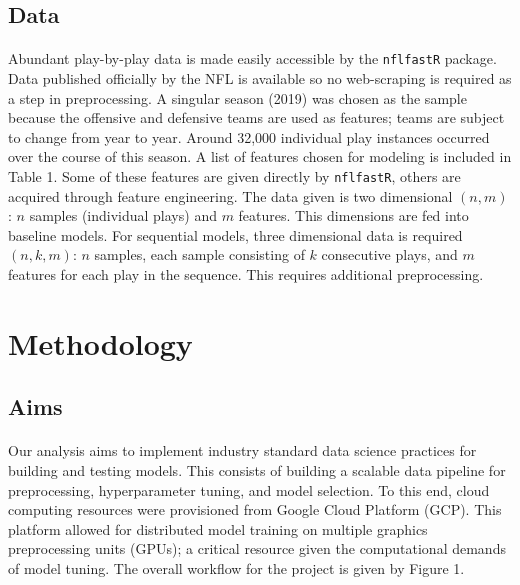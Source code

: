 \documentclass[11pt]{article}
\begin{document}
    \begin{multicols*}{2}
        \subsection{Data}
            \paragraph{}
                Abundant play-by-play data is made easily accessible by the \texttt{nflfastR} package. 
                Data published officially by the NFL is available so no web-scraping is required as a step in preprocessing.
                A singular season (2019) was chosen as the sample because the offensive and defensive teams are used as features; teams are subject to change from year to year. 
                Around 32,000 individual play instances occurred over the course of this season.  
                A list of features chosen for modeling is included in Table 1. 
                Some of these features are given directly by \texttt{nflfastR}, others are acquired through feature engineering.
                The data given is two dimensional $(n,m)$: $n$ samples (individual plays) and $m$ features. 
                This dimensions are fed into baseline models.
                For sequential models, three dimensional data is required $(n,k,m)$: $n$ samples, each sample consisting of $k$ consecutive plays, and $m$ features for each play in the sequence. 
                This requires additional preprocessing.

    \section{Methodology}

        \subsection{Aims}
            \paragraph{}
                Our analysis aims to implement industry standard data science practices for building and testing models.
                This consists of building a scalable data pipeline for preprocessing, hyperparameter tuning, and model selection.
                To this end, cloud computing resources were provisioned from Google Cloud Platform (GCP). 
                This platform allowed for distributed model training on multiple graphics preprocessing units (GPUs); a critical resource given the computational demands of model tuning.  
                The overall workflow for the project is given by Figure 1. 
    
        \end{multicols*}
\end{document}

